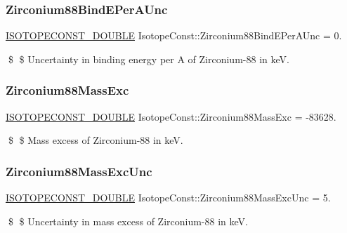\subsubsection{\texorpdfstring{Zirconium88\+Bind\+E\+Per\+A\+Unc}{Zirconium88BindEPerAUnc}}
{\footnotesize\ttfamily \mbox{\hyperlink{group___isotope_const-_macros_ga8f45a7272ce02c0b4c65c44636ed719a}{I\+S\+O\+T\+O\+P\+E\+C\+O\+N\+S\+T\+\_\+\+D\+O\+U\+B\+LE}} Isotope\+Const\+::\+Zirconium88\+Bind\+E\+Per\+A\+Unc = 0.}

\$ \$ Uncertainty in binding energy per A of Zirconium-\/88 in keV. \mbox{\label{group___isotope_const-_zirconium-_zr88_gae324fd5dab1c732ce13b87a54985ad2e}} 
\subsubsection{\texorpdfstring{Zirconium88\+Mass\+Exc}{Zirconium88MassExc}}
{\footnotesize\ttfamily \mbox{\hyperlink{group___isotope_const-_macros_ga8f45a7272ce02c0b4c65c44636ed719a}{I\+S\+O\+T\+O\+P\+E\+C\+O\+N\+S\+T\+\_\+\+D\+O\+U\+B\+LE}} Isotope\+Const\+::\+Zirconium88\+Mass\+Exc = -\/83628.}

\$ \$ Mass excess of Zirconium-\/88 in keV. \mbox{\label{group___isotope_const-_zirconium-_zr88_ga51962075cd68997b751f70e1df6dba8d}} 
\subsubsection{\texorpdfstring{Zirconium88\+Mass\+Exc\+Unc}{Zirconium88MassExcUnc}}
{\footnotesize\ttfamily \mbox{\hyperlink{group___isotope_const-_macros_ga8f45a7272ce02c0b4c65c44636ed719a}{I\+S\+O\+T\+O\+P\+E\+C\+O\+N\+S\+T\+\_\+\+D\+O\+U\+B\+LE}} Isotope\+Const\+::\+Zirconium88\+Mass\+Exc\+Unc = 5.}

\$ \$ Uncertainty in mass excess of Zirconium-\/88 in keV. \mbox{\label{group___isotope_const-_zirconium-_zr88_gaee0dcdb4fcacce93c234ca2256b0d61f}} 

